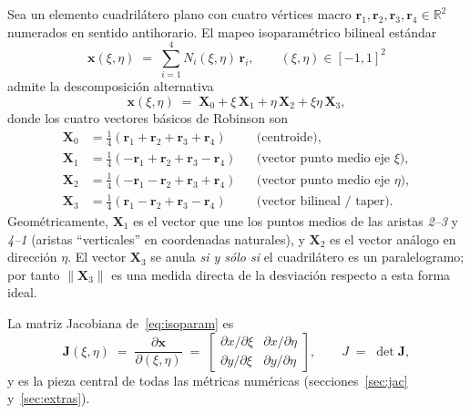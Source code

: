 \documentclass[11pt,a4paper]{article}
\begin{document}
Sea un elemento cuadril\'atero plano con cuatro v\'ertices macro $\mathbf{r}_1,\mathbf{r}_2,\mathbf{r}_3,\mathbf{r}_4\in\mathbb{R}^2$ numerados en sentido antihorario. El mapeo isoparam\'etrico bilineal est\'andar
\begin{equation}
\mathbf{x}(\xi,\eta) \;=\; \sum_{i=1}^{4} N_i(\xi,\eta)\,\mathbf{r}_i, \qquad (\xi,\eta)\in[-1,1]^2
\label{eq:isoparam}
\end{equation}
admite la descomposici\'on alternativa
\begin{equation}
\mathbf{x}(\xi,\eta) \;=\; \mathbf{X}_0 + \xi\,\mathbf{X}_1 + \eta\,\mathbf{X}_2 + \xi\eta\,\mathbf{X}_3,
\label{eq:robinson_decomp}
\end{equation}
donde los cuatro vectores b\'asicos de Robinson son
\begin{align}
\mathbf{X}_0 &= \tfrac{1}{4}(\mathbf{r}_1+\mathbf{r}_2+\mathbf{r}_3+\mathbf{r}_4) && \text{(centroide)}, \label{eq:X0}\\
\mathbf{X}_1 &= \tfrac{1}{4}(-\mathbf{r}_1+\mathbf{r}_2+\mathbf{r}_3-\mathbf{r}_4) && \text{(vector punto medio eje $\xi$)}, \label{eq:X1}\\
\mathbf{X}_2 &= \tfrac{1}{4}(-\mathbf{r}_1-\mathbf{r}_2+\mathbf{r}_3+\mathbf{r}_4) && \text{(vector punto medio eje $\eta$)}, \label{eq:X2}\\
\mathbf{X}_3 &= \tfrac{1}{4}(\mathbf{r}_1-\mathbf{r}_2+\mathbf{r}_3-\mathbf{r}_4) && \text{(vector bilineal / taper)}. \label{eq:X3}
\end{align}
Geom\'etricamente, $\mathbf{X}_1$ es el vector que une los puntos medios de las aristas \emph{2--3} y \emph{4--1} (aristas ``verticales'' en coordenadas naturales), y $\mathbf{X}_2$ es el vector an\'alogo en direcci\'on $\eta$. El vector $\mathbf{X}_3$ se anula \emph{si y s\'olo si} el cuadril\'atero es un paralelogramo; por tanto $\|\mathbf{X}_3\|$ es una medida directa de la desviaci\'on respecto a esta forma ideal.

La matriz Jacobiana de~\eqref{eq:isoparam} es
\begin{equation}
\mathbf{J}(\xi,\eta) \;=\; \frac{\partial \mathbf{x}}{\partial(\xi,\eta)} \;=\; \begin{bmatrix} \partial x/\partial\xi & \partial x/\partial\eta \\ \partial y/\partial\xi & \partial y/\partial\eta \end{bmatrix}, \qquad J \;=\; \det\mathbf{J},
\label{eq:jacobian}
\end{equation}
y es la pieza central de todas las m\'etricas num\'ericas (secciones~\ref{sec:jac} y~\ref{sec:extras}).
\end{document}
